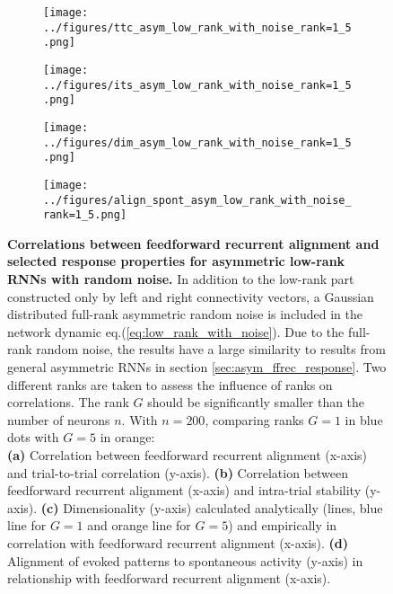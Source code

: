 \documentclass[11pt]{article}
\begin{document}
		\begin{figure}
			\centering
			\begin{subfigure}[b]{0.45\textwidth}
				\centering
				\texttt{[image: ../figures/ttc\_asym\_low\_rank\_with\_noise\_rank=1\_5.png]}
				\caption{}
			\end{subfigure}
			\hfill
			\begin{subfigure}[b]{0.45\textwidth}
				\centering
				\texttt{[image: ../figures/its\_asym\_low\_rank\_with\_noise\_rank=1\_5.png]}
				\caption{}
			\end{subfigure}
			\newline
			\begin{subfigure}[b]{0.45\textwidth}
				\centering
				\texttt{[image: ../figures/dim\_asym\_low\_rank\_with\_noise\_rank=1\_5.png]}
				\caption{}
			\end{subfigure}
			\hfill
			\begin{subfigure}[b]{0.45\textwidth}
				\centering
				\texttt{[image: ../figures/align\_spont\_asym\_low\_rank\_with\_noise\_rank=1\_5.png]}
				\caption{}
			\end{subfigure}
		\caption[Correlations between feedforward recurrent alignment and selected response properties for asymmetric low-rank RNNs with random noise]{\textbf{Correlations between feedforward recurrent alignment and selected response properties for asymmetric low-rank RNNs with random noise.} In addition to the low-rank part constructed only by left and right connectivity vectors, a Gaussian distributed full-rank asymmetric random noise is included in the network dynamic eq.(\ref{eq:low_rank_with_noise}). Due to the full-rank random noise, the results have a large similarity to results from general asymmetric RNNs in section \ref{sec:asym_ffrec_response}. Two different ranks are taken to assess the influence of ranks on correlations. The rank $G$ should be significantly smaller than the number of neurons $n$. 
		With $n = 200$, comparing ranks $G = 1$ in blue dots with $G=5$ in orange:\\
		\textbf{(a)} Correlation between feedforward recurrent alignment (x-axis) and trial-to-trial correlation (y-axis). 
		\textbf{(b)} Correlation between feedforward recurrent alignment (x-axis) and intra-trial stability (y-axis). 
		\textbf{(c)} Dimensionality (y-axis) calculated analytically (lines, blue line for $G=1$ and orange line for $G=5$) and empirically in correlation with feedforward recurrent alignment (x-axis).
		\textbf{(d)} Alignment of evoked patterns to spontaneous activity (y-axis) in relationship with feedforward recurrent alignment (x-axis).}
		\label{fig:result_asym_low_rank_with_noise}
		\end{figure}
 
\end{document}
